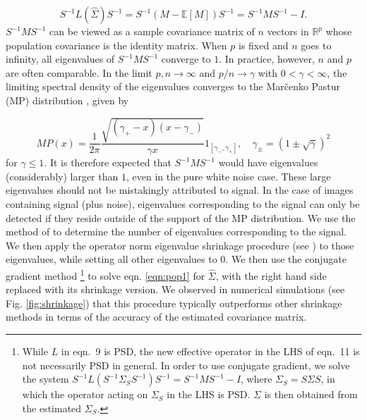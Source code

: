 \documentclass[review]{elsarticle}
\begin{document}
\begin{equation}
 S^{-1} L(\hat\Sigma)  S^{-1} = S^{-1}(M - \mathbb{E}[M]) S^{-1} = S^{-1} M S^{-1} - I .
\label{eqn:pop1}
\end{equation}
$S^{-1}MS^{-1}$ can be viewed as a sample covariance matrix of
$n$ vectors in $ \mathbb{R}^p$ whose population covariance is the identity matrix.
When $p$ is fixed and $n$ goes to infinity, all eigenvalues of $S^{-1}MS^{-1}$ converge to $1$.
In practice, however, $n$ and $p$ are often comparable. In the limit $p, n \to 
\infty$ and $p/n \to \gamma$ with $0 < \gamma < \infty$, the limiting spectral 
density of the eigenvalues converges to the Mar\v{c}enko Pastur (MP) distribution \cite{marcenko},
given by

\begin{equation}
MP(x) = \frac{1}{2\pi}\frac{\sqrt{(\gamma_+ - x)(x - \gamma_-)}}{\gamma x}1_{[\gamma_-,\gamma_+]}, \quad \gamma_{\pm} =(1 \pm \sqrt{\gamma})^2 
\end{equation}
for $\gamma \leq 1$. It is therefore expected that $S^{-1}MS^{-1}$ would have eigenvalues 
(considerably) larger than $1$, even in the pure white noise case. These large 
eigenvalues should not be mistakingly attributed to signal. In the case of 
images containing signal (plus noise), eigenvalues corresponding to the signal 
can only be detected if they reside outside of the support of the MP 
distribution. We use the method of \cite{knadler} to determine the number of eigenvalues 
corresponding to the signal. We then apply the operator norm eigenvalue 
shrinkage procedure (see \cite{donoho}) to those eigenvalues, while setting all other eigenvalues to 
$0$. We then use the conjugate gradient method \footnote{While $L$ in eqn.\ 9 is PSD, the new effective operator in the LHS of eqn.\ 11 is not necessarily PSD in general.
In order to use conjugate gradient, we solve the system $S^{-1}L(S^{-1}\Sigma_S S^{-1})S^{-1} = S^{-1}MS^{-1}-I$, where
$\Sigma_S = S \Sigma S$, in which the operator acting on $\Sigma_S$ in the LHS is PSD. $\Sigma$ is then obtained
from the estimated $\Sigma_S$.
} to solve eqn. \ref{eqn:pop1} for $\hat{\Sigma}$, with the right hand side 
replaced with its shrinkage version. We observed in numerical simulations (see Fig. \ref{fig:shrinkage}) that this procedure
typically outperforms other shrinkage methods in terms of the accuracy of the estimated covariance matrix.
 
\end{document}
